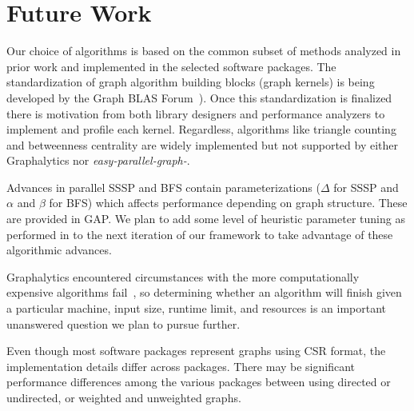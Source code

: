 \documentclass[conference]{IEEEtran}
\begin{document}
\section{Future Work}\label{sec:fw}

Our choice of algorithms is based on the common subset of methods analyzed in prior work and implemented in the selected software packages. The standardization of graph algorithm building blocks (graph kernels) is being developed by the Graph BLAS Forum~\cite{Mattson:2013:graphblas}). Once this standardization is finalized there is motivation from both library designers and performance analyzers to implement and profile each kernel. Regardless, algorithms like triangle counting and betweenness centrality are widely implemented but not supported by either Graphalytics nor \emph{easy-parallel-graph\mbox{-\textasteriskcentered}}. 

Advances in parallel SSSP and BFS contain parameterizations ($\Delta$ for SSSP and $\alpha$ and $\beta$ for BFS) which affects performance depending on graph structure. These are provided in GAP. We plan to add some level of heuristic parameter tuning as performed in \cite{Beamer:2012:DOBFS} to the next iteration of our framework to take advantage of these algorithmic advances.

Graphalytics encountered circumstances with the more computationally expensive algorithms fail~\cite{Iosup:2016:Graphalyticstech}, so determining whether an algorithm will finish given a particular machine, input size, runtime limit, and resources is an important unanswered question we plan to pursue further.

Even though most software packages represent graphs using CSR format, the implementation details differ across packages. There may be significant performance differences among the various packages between using directed or undirected, or weighted and unweighted graphs.
\end{document}
